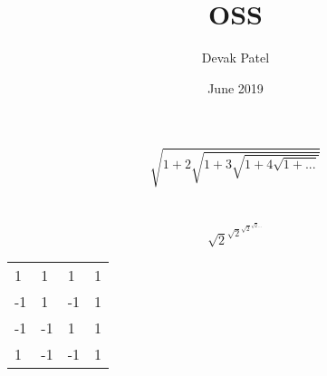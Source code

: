 \documentclass{article}
\title{OSS}
\author{Devak Patel}
\date{June 2019}
\begin{document}
\maketitle
$$\sqrt{1+2\sqrt{1+3\sqrt{1+4\sqrt{1+...}}}} $$\\\\
$$\sqrt{2}^{\sqrt{2}^{\sqrt{2}^{\sqrt{2}...}}}$$


\begin{table}[h]
\centering
\begin{tabular}{|llll|}
\cline{1-1} \cline{4-4}
1  & 1  & 1  & 1 \\
-1 & 1  & -1 & 1 \\
-1 & -1 & 1  & 1 \\
1  & -1 & -1 & 1 \\ \cline{1-1} \cline{4-4} 
\end{tabular}
\end{table}
\end{document}
